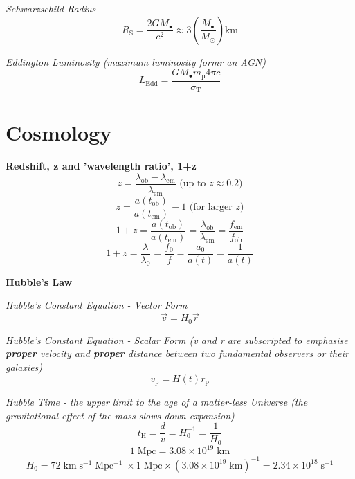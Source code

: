\documentclass{spy}
\begin{document}
\textit {Schwarzschild Radius}
\begin{equation}
R_\mathrm{S} = \frac {2 G M_\bullet}{c^2} \approx 3 \left(\frac {M_\bullet}{M_\odot} \right) \mathrm{km}
\end{equation}

\textit {Eddington Luminosity (maximum luminosity formr an AGN)}
\begin{equation}
L_\mathrm{Edd} = \frac {G M_\bullet m_\mathrm{p} 4 \pi c}{\sigma_\mathrm{T}}
\end{equation}




\newpage

\section{Cosmology}

\textbf {Redshift, z and 'wavelength ratio', 1+z}
\begin{equation}
z = \frac {\lambda_\mathrm{ob} - \lambda_\mathrm{em}}{\lambda_\mathrm{em}} \text{ (up to \(z \approx 0.2\))}
\end{equation}
\begin{equation}
z = \frac {a(t_\mathrm{ob})}{a(t_\mathrm{em})} - 1 \text{ (for larger \(z\))}
\end{equation}
\begin{equation}
1 + z = \frac{a(t_\mathrm{ob})}{a(t_\mathrm{em})} = \frac {\lambda_\mathrm{ob}}{\lambda_\mathrm{em}} = \frac {f_\mathrm{em}}{f_\mathrm{ob}}
\end{equation}
\begin{equation}
1 + z  = \frac{\lambda}{\lambda_\mathrm{0}} = \frac {f_\mathrm{0}}{f} = \frac{a_\mathrm{0}}{a(t)} = \frac{1}{a(t)}
\end{equation}


\textbf {Hubble's Law}

\textit {Hubble's Constant Equation - Vector Form}
\begin{equation}
\vec{v} = H_0 \vec{r}
\end{equation}

\textit {Hubble's Constant Equation - Scalar Form (v and r are subscripted to emphasise \textbf{proper} velocity and \textbf{proper} distance between two fundamental observers or their galaxies)}
\begin{equation}
v_\mathrm{p} = H(t) r_\mathrm{p}
\end{equation}

\textit {Hubble Time - the upper limit to the age of a matter-less Universe (the gravitational effect of the mass slows down expansion)}
\begin{equation}
t_\mathrm{H} = \frac {d}{v} = H_\mathrm{0}^{-1} = \frac {1}{H_\mathrm{0}}
\end{equation}
\begin{equation}
1 \; \mathrm{Mpc} = 3.08 \times 10^{19} \; \mathrm{km}
\end{equation}
\begin{equation}
H_\mathrm{0} = 72 \; \mathrm{km} \;  \mathrm{s^{-1}} \; \mathrm{Mpc^{-1}} \; \times 1 \; \mathrm{Mpc} \times (3.08 \times 10^{19} \; \mathrm{km})^{-1} = 2.34 \times 10^{18} \; \mathrm{s^{-1}}
\end{equation}
\end{document}
